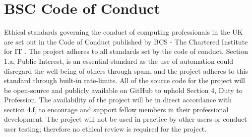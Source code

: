 \section{BSC Code of Conduct}

Ethical standards governing the conduct of computing professionals in the UK are set out in the Code of Conduct published by BCS - The Chartered Institute for IT \cite{bcs}. The project adheres to all standards set by the code of conduct. Section 1.a, Public Interest, is an essential standard as the use of automation could disregard the well-being of others through spam, and the project adheres to this standard through built-in rate-limits. All of the source code for the project will be open-source and publicly available on GitHub to uphold Section 4, Duty to Profession. The availability of the project will be in direct accordance with section 4.f, to encourage and support fellow members in their professional development. The project will not be used in practice by other users or conduct user testing; therefore no ethical review is required for the project.